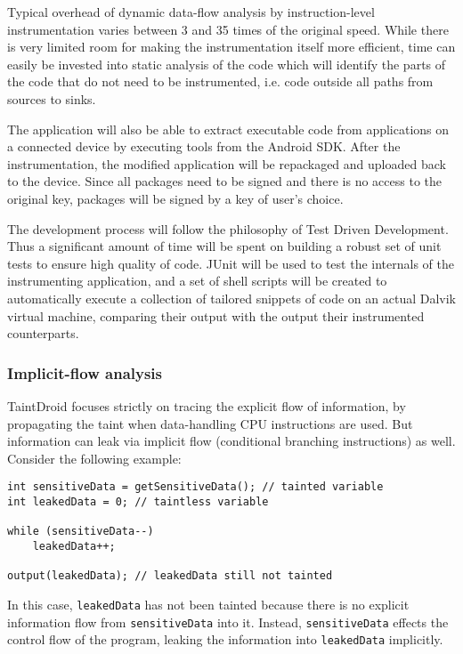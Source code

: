 \documentclass[12pt]{article}
\begin{document}
Typical overhead of dynamic data-flow analysis by instruction-level 
instrumentation varies between 3 and 35 times of the original speed. While 
there is very limited room for making the instrumentation itself more 
efficient, time can easily be invested into static analysis of the code which 
will identify the parts of the code that do not need to be instrumented, 
i.e. code outside all paths from sources to sinks. 

The application will also be able to extract executable code from 
applications on a connected device by executing tools from the Android SDK.
After the instrumentation, the modified application will be repackaged and
uploaded back to the device. Since all packages need to be signed and there
is no access to the original key, packages will be signed by a key of user's
choice.

The development process will follow the philosophy of Test Driven 
Development. Thus a significant amount of time will be spent on building 
a robust set of unit tests to ensure high quality of code. JUnit will be 
used to test the internals of the instrumenting application, and a set of 
shell scripts will be created to automatically execute a collection
of tailored snippets of code on an actual Dalvik virtual machine, 
comparing their output with the output their instrumented counterparts.

\subsubsection*{Implicit-flow analysis}

TaintDroid focuses strictly on tracing the explicit flow of information, 
by propagating the taint when data-handling CPU instructions are used. 
But information can leak via implicit flow (conditional branching 
instructions) as well. Consider the following example:

\begin{verbatim}
int sensitiveData = getSensitiveData(); // tainted variable
int leakedData = 0; // taintless variable

while (sensitiveData--)
    leakedData++;

output(leakedData); // leakedData still not tainted
\end{verbatim}

In this case, \verb|leakedData| has not been tainted because there is 
no explicit information flow from \verb|sensitiveData| into it. Instead, 
\verb|sensitiveData| effects the control flow of the program, leaking
the information into \verb|leakedData| implicitly. 
\end{document}
